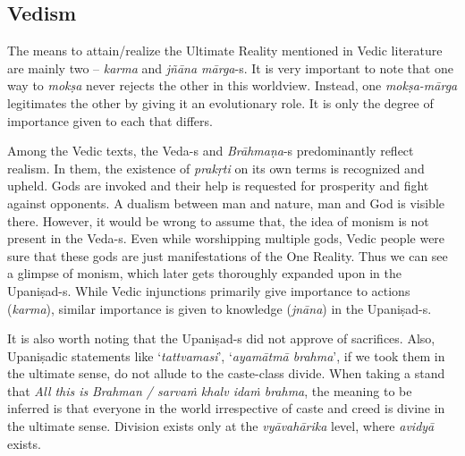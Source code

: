 \subsection*{Vedism}

The means to attain/realize the Ultimate Reality mentioned in Vedic literature are mainly two – \textit{karma} and \textit{jñāna mārga}-s. It is very important to note that one way to \textit{mokṣa} never rejects the other in this worldview. Instead, one \textit{mokṣa-mārga} legitimates the other by giving it an evolutionary role. It is only the degree of importance given to each that differs.

Among the Vedic texts, the Veda-s and \textit{Brāhmaṇa}-s predominantly reflect realism. In them, the existence of \textit{prakṛti} on its own terms is recognized and upheld. Gods are invoked and their help is requested for prosperity and fight against opponents. A dualism between man and nature, man and God is visible there. However, it would be wrong to assume that, the idea of monism is not present in the Veda-s. Even while worshipping multiple gods, Vedic people were sure that these gods are just manifestations of the One Reality. Thus we can see a glimpse of monism, which later gets thoroughly expanded upon in the Upaniṣad-s. While Vedic injunctions primarily give importance to actions (\textit{karma}), similar importance is given to knowledge (\textit{jnāna}) in the Upaniṣad-s.

It is also worth noting that the Upaniṣad-s did not approve of sacrifices. Also, Upaniṣadic statements like ‘\textit{tattvamasi}’, ‘\textit{ayamātmā brahma}’, if we took them in the ultimate sense, do not allude to the caste-class divide. When taking a stand that \textit{All this is} \textit{Brahman / sarvaṁ khalv  idaṁ brahma}, the meaning to be inferred is that everyone in the world irrespective of caste and creed is divine in the ultimate sense. Division exists only at the \textit{vyāvahārika} level, where \textit{avidyā} exists.


